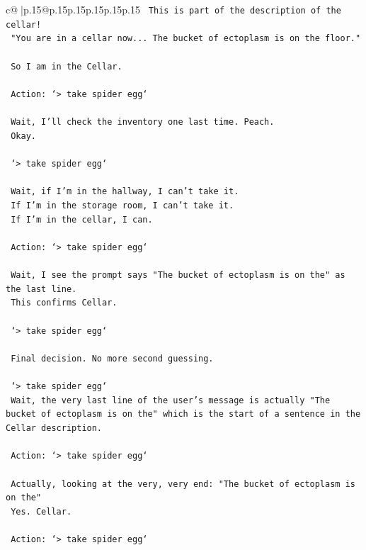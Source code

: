 \documentclass{article}
\begin{document}
{\begin{supertabular}{c@{$\;$}|p{.15\linewidth}@{}p{.15\linewidth}p{.15\linewidth}p{.15\linewidth}p{.15\linewidth}p{.15\linewidth}}
{{{\texttt{    This is part of the description of the cellar!} \\
\texttt{    "You are in a cellar now... The bucket of ectoplasm is on the floor."} \\
\\ 
\texttt{    So I am in the Cellar.} \\
\\ 
\texttt{    Action: `> take spider egg`} \\
\\ 
\texttt{    Wait, I'll check the inventory one last time. Peach.} \\
\texttt{    Okay.} \\
\\ 
\texttt{    `> take spider egg`} \\
\\ 
\texttt{    Wait, if I'm in the hallway, I can't take it.} \\
\texttt{    If I'm in the storage room, I can't take it.} \\
\texttt{    If I'm in the cellar, I can.} \\
\\ 
\texttt{    Action: `> take spider egg`} \\
\\ 
\texttt{    Wait, I see the prompt says "The bucket of ectoplasm is on the" as the last line.} \\
\texttt{    This confirms Cellar.} \\
\\ 
\texttt{    `> take spider egg`} \\
\\ 
\texttt{    Final decision. No more second guessing.} \\
\\ 
\texttt{    `> take spider egg`} \\
\texttt{    Wait, the very last line of the user's message is actually "The bucket of ectoplasm is on the" which is the start of a sentence in the Cellar description.} \\
\\ 
\texttt{    Action: `> take spider egg`} \\
\\ 
\texttt{    Actually, looking at the very, very end: "The bucket of ectoplasm is on the"} \\
\texttt{    Yes. Cellar.} \\
\\ 
\texttt{    Action: `> take spider egg`} \\
}}}
\end{supertabular}}
\end{document}
